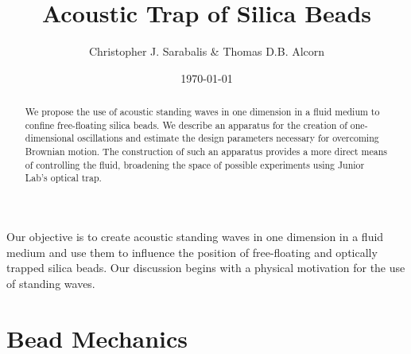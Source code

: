 \usepackage{lgrind}        %
\usepackage{chapterbib}    %
\usepackage{color}         %
\usepackage{graphics}      %
\usepackage[pdftex]{graphicx}      %
\usepackage{longtable}     %
\usepackage{epsf}          %
\usepackage{bm}            %
\usepackage{thumbpdf}
\usepackage[colorlinks=true]{hyperref}  %




\title{Acoustic Trap of Silica Beads}
\author         {Christopher J. Sarabalis \& Thomas D.B. Alcorn}
\date{\today}


\begin{abstract}
We propose the use of acoustic standing waves in one dimension in a fluid medium to confine  free-floating silica beads. We describe an apparatus for the creation of one-dimensional oscillations and estimate the design parameters necessary for overcoming Brownian motion.  The construction of such an apparatus provides a more direct means of controlling the fluid, broadening the space of possible experiments using Junior Lab's optical trap.
\end{abstract}

\maketitle

Our objective is to create acoustic standing waves in one dimension in a fluid medium and use them to influence the position of free-floating and optically trapped silica beads. Our discussion begins with a physical motivation for the use of standing waves.

\section{Bead Mechanics}
\label{sec:beadmechanics}

